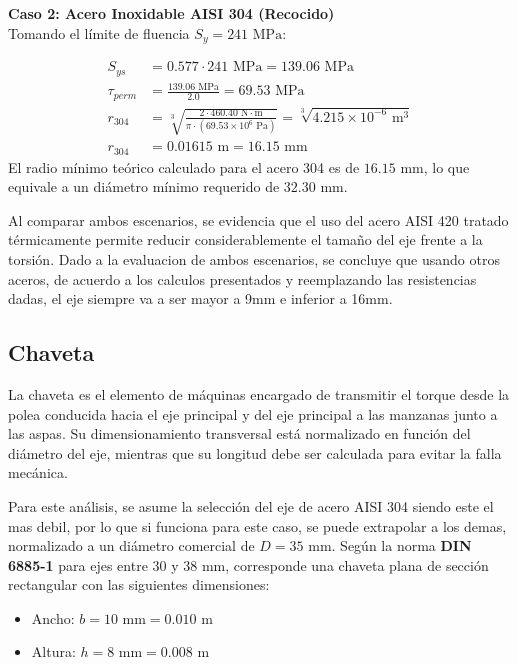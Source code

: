\documentclass[12pt, a4paper]{article}
\begin{document}
\vspace{0.5cm}

\textbf{Caso 2: Acero Inoxidable AISI 304 (Recocido)} \\
Tomando el límite de fluencia $S_y = 241 \text{ MPa}$:

\begin{align}
    S_{ys} &= 0.577 \cdot 241 \text{ MPa} = 139.06 \text{ MPa} \\[6pt]
    \tau_{perm} &= \frac{139.06 \text{ MPa}}{2.0} = 69.53 \text{ MPa} \\[6pt]
    r_{304} &= \sqrt[3]{\frac{2 \cdot 460.40 \text{ N}\cdot\text{m}}{\pi \cdot (69.53 \times 10^6 \text{ Pa})}} = \sqrt[3]{4.215 \times 10^{-6} \text{ m}^3} \\[6pt]
    r_{304} &= 0.01615 \text{ m} = 16.15 \text{ mm}
\end{align}
El radio mínimo teórico calculado para el acero 304 es de $16.15 \text{ mm}$, lo que equivale a un diámetro mínimo requerido de $32.30 \text{ mm}$.

Al comparar ambos escenarios, se evidencia que el uso del acero AISI 420 tratado térmicamente permite reducir considerablemente el tamaño del eje frente a la torsión. Dado a la evaluacion de ambos escenarios, se concluye que usando otros aceros, de acuerdo a los calculos presentados y reemplazando las resistencias dadas, el eje siempre va a ser mayor a 9mm  e inferior a 16mm.

\subsection{Chaveta}
La chaveta es el elemento de máquinas encargado de transmitir el torque desde la polea conducida hacia el eje principal y del eje principal a las manzanas junto a las aspas. Su dimensionamiento transversal está normalizado en función del diámetro del eje, mientras que su longitud debe ser calculada para evitar la falla mecánica. 

Para este análisis, se asume la selección del eje de acero AISI 304 siendo este el mas debil, por lo que si funciona para este caso, se puede extrapolar a los demas, normalizado a un diámetro comercial de $D = 35 \text{ mm}$. Según la norma \textbf{DIN 6885-1} para ejes entre 30 y 38 mm, corresponde una chaveta plana de sección rectangular con las siguientes dimensiones:
\begin{itemize}
    \item Ancho: $b = 10 \text{ mm} = 0.010 \text{ m}$
    \item Altura: $h = 8 \text{ mm} = 0.008 \text{ m}$
\end{itemize}
\end{document}
